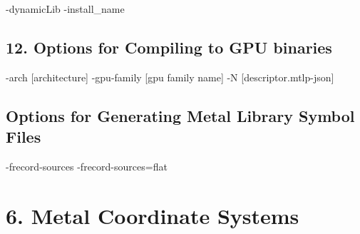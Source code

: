 -dynamicLib
-install_name

\subsection{12. Options for Compiling to GPU binaries}

-arch  [architecture]
-gpu-family [gpu family name]
-N [descriptor.mtlp-json]

\subsection{Options for Generating Metal Library Symbol Files}

-frecord-sources
-frecord-sources=flat


\section{6. Metal Coordinate Systems}



